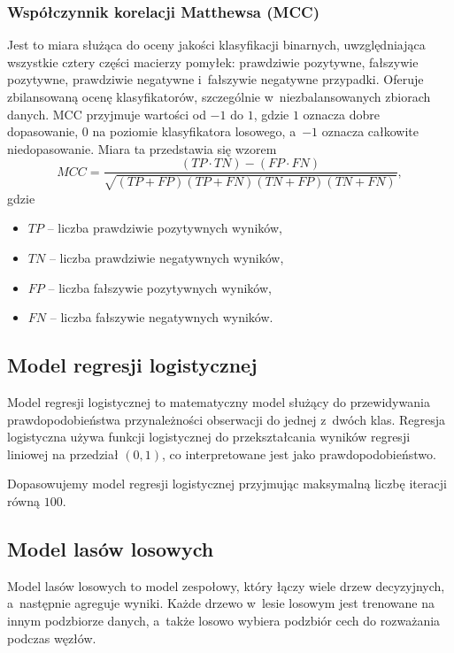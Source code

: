 \documentclass[12pt]{article}
\begin{document}
	\subsubsection{Współczynnik korelacji Matthewsa (MCC)}
	Jest to miara służąca do oceny jakości klasyfikacji binarnych, uwzględniająca wszystkie cztery części macierzy pomyłek: prawdziwie pozytywne, fałszywie pozytywne, prawdziwie negatywne i~fałszywie negatywne przypadki.
	Oferuje zbilansowaną ocenę klasyfikatorów, szczególnie w~niezbalansowanych zbiorach danych.
	MCC przyjmuje wartości od $-1$ do $1$, gdzie $1$ oznacza dobre dopasowanie, $0$ na poziomie klasyfikatora losowego, a~$-1$ oznacza całkowite niedopasowanie.
	Miara ta przedstawia się wzorem
	\[MCC = \frac{(TP \cdot TN) - (FP \cdot FN)}{\sqrt{(TP + FP)(TP + FN)(TN + FP)(TN + FN)}},\]
	gdzie
	\begin{itemize}
		\item $TP$ -- liczba prawdziwie pozytywnych wyników,
		\item $TN$ -- liczba prawdziwie negatywnych wyników,
		\item $FP$ -- liczba fałszywie pozytywnych wyników,
		\item $FN$ -- liczba fałszywie negatywnych wyników.
	\end{itemize}

	\subsection{Model regresji logistycznej}\label{subsec:model-regresji-logistycznej}
	Model regresji logistycznej to matematyczny model służący do przewidywania prawdopodobieństwa przynależności obserwacji do jednej z~dwóch klas.
	Regresja logistyczna używa funkcji logistycznej do przekształcania wyników regresji liniowej na przedział $(0,1)$, co interpretowane jest jako prawdopodobieństwo.

	\vspace{0.25cm}

	Dopasowujemy model regresji logistycznej przyjmując maksymalną liczbę iteracji równą $100$.

	\subsection{Model lasów losowych}\label{subsec:model-lasow-losowych}
	Model lasów losowych to model zespołowy, który łączy wiele drzew decyzyjnych, a~następnie agreguje wyniki.
	Każde drzewo w~lesie losowym jest trenowane na innym podzbiorze danych, a~także losowo wybiera podzbiór cech do rozważania podczas węzłów.
\end{document}
